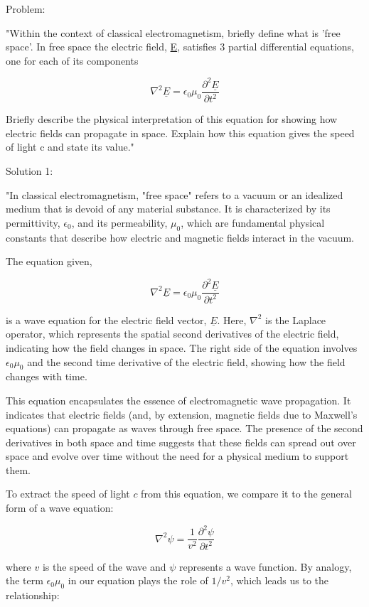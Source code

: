 Problem: 

"Within the context of classical electromagnetism, briefly define what is 'free space'. In free space the electric field, \underline{E}, satisfies 3 partial differential equations, one for each of its components

\[
\nabla^{2}\underline{E} =  \epsilon_{0}\mu_{0}\frac{\partial^2 \underline{E}}{\partial t^{2}}
\]

Briefly describe the physical interpretation of this equation for showing how electric fields can propagate in space. Explain how this equation gives the speed of light c and state its value." 

Solution 1: 

"In classical electromagnetism, "free space" refers to a vacuum or an idealized medium that is devoid of any material substance. It is characterized by its permittivity, $\epsilon_{0}$, and its permeability, $\mu_{0}$, which are fundamental physical constants that describe how electric and magnetic fields interact in the vacuum.

The equation given,

\[
\nabla^{2}\underline{E} =  \epsilon_{0}\mu_{0}\frac{\partial^2 \underline{E}}{\partial t^{2}}
\]

is a wave equation for the electric field vector, $\underline{E}$. Here, $\nabla^{2}$ is the Laplace operator, which represents the spatial second derivatives of the electric field, indicating how the field changes in space. The right side of the equation involves $\epsilon_{0}\mu_{0}$ and the second time derivative of the electric field, showing how the field changes with time.

This equation encapsulates the essence of electromagnetic wave propagation. It indicates that electric fields (and, by extension, magnetic fields due to Maxwell's equations) can propagate as waves through free space. The presence of the second derivatives in both space and time suggests that these fields can spread out over space and evolve over time without the need for a physical medium to support them.

To extract the speed of light $c$ from this equation, we compare it to the general form of a wave equation:

\[
\nabla^{2}\psi = \frac{1}{v^2}\frac{\partial^2 \psi}{\partial t^{2}}
\]

where $v$ is the speed of the wave and $\psi$ represents a wave function. By analogy, the term $\epsilon_{0}\mu_{0}$ in our equation plays the role of $1/v^2$, which leads us to the relationship:

